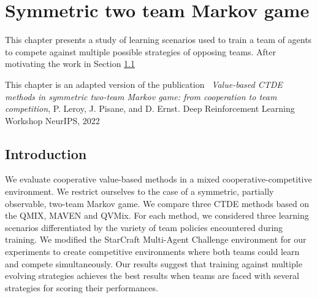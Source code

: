 \chapter{Symmetric two team Markov game}\label{ch:2teams}
\begin{chapter_outline}

This chapter presents a study of learning scenarios used to train a team of agents to compete against multiple possible strategies of opposing teams.
After motivating the work in Section \ref{sec:ch7_intro}

This chapter is an adapted version of the publication~\citep{leroy2022twoteam} \textit{Value-based CTDE methods in symmetric two-team Markov game: from cooperation to team competition}, P. Leroy, J. Pisane, and D. Ernst. Deep Reinforcement Learning Workshop NeurIPS, 2022

\end{chapter_outline}

\section{Introduction} \label{sec:ch7_intro}

We evaluate cooperative value-based methods in a mixed cooperative-competitive environment.
We restrict ourselves to the case of a symmetric, partially observable, two-team Markov game.
We compare three CTDE methods based on the QMIX, MAVEN and QVMix.
For each method, we considered three learning scenarios differentiated by the variety of team policies encountered during training.
We modified the StarCraft Multi-Agent Challenge environment for our experiments to create competitive environments where both teams could learn and compete simultaneously.
Our results suggest that training against multiple evolving strategies achieves the best results when teams are faced with several strategies for scoring their performances.


